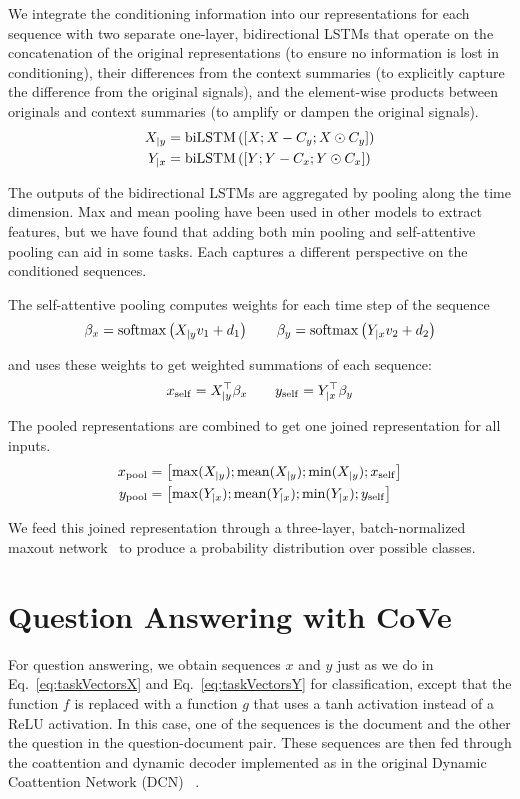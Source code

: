 We integrate the conditioning information into our representations
for each sequence with two separate one-layer, 
bidirectional LSTMs that operate on the concatenation of
the original representations
(to ensure no information is lost in conditioning), 
their differences from the context summaries
(to explicitly capture the difference from the original signals),
and the element-wise products between originals and context summaries
(to amplify or dampen the original signals).
\begin{align}
X_{|y} &= {\rm biLSTM} \left(  \left[X; X - C_y; X \odot C_y \right] \right)
\\
Y_{|x} &= {\rm biLSTM} \left(  \left[Y; Y - C_x; Y \odot C_x \right]  \right)
\end{align}

The outputs of the bidirectional LSTMs are aggregated by pooling along the time dimension.
Max and mean pooling have been used in other models to extract features, 
but we have found that adding both min pooling 
and self-attentive pooling can aid in some tasks.
Each captures a different perspective on the conditioned sequences.

The self-attentive pooling computes weights for each time step of the sequence 
\begin{equation}
\beta_{x} = {\rm softmax} \left( X_{|y}v_1 + d_1 \right)
\qquad
\beta_{y} = {\rm softmax} \left( Y_{|x}v_2 + d_2 \right)
\end{equation}

and uses these weights to get weighted summations of each sequence:
\begin{equation}
x_{\rm self} = X_{|y}^\top \beta_{x}
\qquad
y_{\rm self} = Y_{|x}^\top \beta_{y}
\end{equation}

The pooled representations are combined to get one joined representation for all inputs. 
\begin{align}
x_{\rm pool} &= \left [ \max(X_{|y}); {\rm mean}(X_{|y}); \min(X_{|y}); x_{\rm self} \right ]
\\
y_{\rm pool} &= \left [ \max(Y_{|x}); {\rm mean}(Y_{|x}); \min(Y_{|x});  y_{\rm self} \right ]
\end{align}

We feed this joined representation through a three-layer, 
batch-normalized~\citep{Ioffe2015BatchNA} maxout network~\citep{Goodfellow2013MaxoutN} 
to produce a probability distribution over possible classes.

\section{Question Answering with CoVe}

For question answering, 
we obtain sequences $x$ and $y$ just as we do in Eq.~\ref{eq:taskVectorsX} and Eq.~\ref{eq:taskVectorsY} for classification, except that the function $f$ is replaced with a function $g$ that uses a tanh activation instead of a ReLU activation.
In this case, one of the sequences is the document and the other the question in the question-document pair.
These sequences are then fed through the coattention and dynamic decoder implemented as in the original Dynamic Coattention Network (DCN) ~\citep{xiong2016dynamic}. 